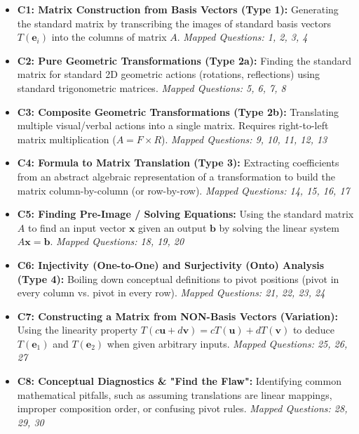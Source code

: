 \documentclass[12pt]{article}
\begin{document}
\begin{itemize}
    \item \textbf{C1: Matrix Construction from Basis Vectors (Type 1):} Generating the standard matrix by transcribing the images of standard basis vectors $T(\mathbf{e}_i)$ into the columns of matrix $A$.
    \textit{Mapped Questions: 1, 2, 3, 4}
    
    \item \textbf{C2: Pure Geometric Transformations (Type 2a):} Finding the standard matrix for standard 2D geometric actions (rotations, reflections) using standard trigonometric matrices. 
    \textit{Mapped Questions: 5, 6, 7, 8}
    
    \item \textbf{C3: Composite Geometric Transformations (Type 2b):} Translating multiple visual/verbal actions into a single matrix. Requires right-to-left matrix multiplication ($A = F \times R$).
    \textit{Mapped Questions: 9, 10, 11, 12, 13}
    
    \item \textbf{C4: Formula to Matrix Translation (Type 3):} Extracting coefficients from an abstract algebraic representation of a transformation to build the matrix column-by-column (or row-by-row).
    \textit{Mapped Questions: 14, 15, 16, 17}
    
    \item \textbf{C5: Finding Pre-Image / Solving Equations:} Using the standard matrix $A$ to find an input vector $\mathbf{x}$ given an output $\mathbf{b}$ by solving the linear system $A\mathbf{x} = \mathbf{b}$.
    \textit{Mapped Questions: 18, 19, 20}
    
    \item \textbf{C6: Injectivity (One-to-One) and Surjectivity (Onto) Analysis (Type 4):} Boiling down conceptual definitions to pivot positions (pivot in every column vs. pivot in every row).
    \textit{Mapped Questions: 21, 22, 23, 24}
    
    \item \textbf{C7: Constructing a Matrix from NON-Basis Vectors (Variation):} Using the linearity property $T(c\mathbf{u} + d\mathbf{v}) = cT(\mathbf{u}) + dT(\mathbf{v})$ to deduce $T(\mathbf{e}_1)$ and $T(\mathbf{e}_2)$ when given arbitrary inputs.
    \textit{Mapped Questions: 25, 26, 27}
    
    \item \textbf{C8: Conceptual Diagnostics \& "Find the Flaw":} Identifying common mathematical pitfalls, such as assuming translations are linear mappings, improper composition order, or confusing pivot rules.
    \textit{Mapped Questions: 28, 29, 30}
\end{itemize}
\end{document}

